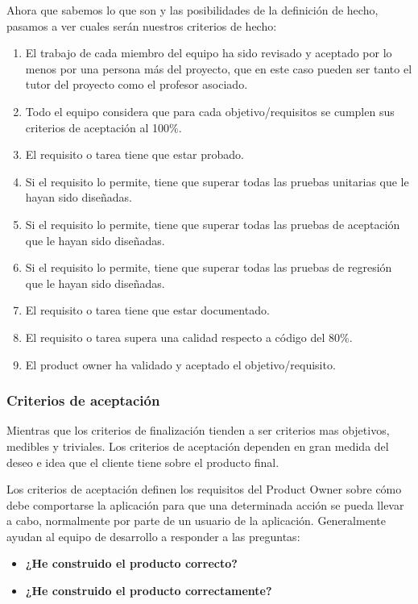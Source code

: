 Ahora que sabemos lo que son y las posibilidades de la definición de hecho, pasamos a ver cuales serán nuestros criterios de hecho: 
\begin{enumerate}
    \item El trabajo de cada miembro del equipo ha sido revisado y aceptado por lo menos por una persona más del proyecto, que en este caso pueden ser tanto el tutor del proyecto como el profesor asociado.
    \item Todo el equipo considera que para cada objetivo/requisitos se cumplen sus criterios de aceptación al 100\%. 
    \item El requisito o tarea tiene que estar probado.
    \item Si el requisito lo permite, tiene que superar todas las pruebas unitarias que le hayan sido diseñadas. 
    \item Si el requisito lo permite, tiene que superar todas las pruebas de aceptación que le hayan sido diseñadas. 
    \item Si el requisito lo permite, tiene que superar todas las pruebas de regresión que le hayan sido diseñadas. 
    \item El requisito o tarea tiene que estar documentado.
    \item El requisito o tarea supera una calidad respecto a código del 80\%.
    \item El product owner ha validado y aceptado el objetivo/requisito.
\end{enumerate}

\subsubsection{Criterios de aceptación}

Mientras que los criterios de finalización tienden a ser criterios mas objetivos, medibles y triviales. Los criterios de aceptación dependen en gran medida del deseo e idea que el cliente tiene sobre el producto final. 

Los criterios de aceptación definen los requisitos del Product Owner sobre cómo debe comportarse la aplicación para que una determinada acción se pueda llevar a cabo, normalmente por parte de un usuario de la aplicación. Generalmente ayudan al equipo de desarrollo a responder a las preguntas: 
\begin{itemize}
    \item \textbf{¿He construido el producto correcto?}
    \item \textbf{¿He construido el producto correctamente?}
\end{itemize}


